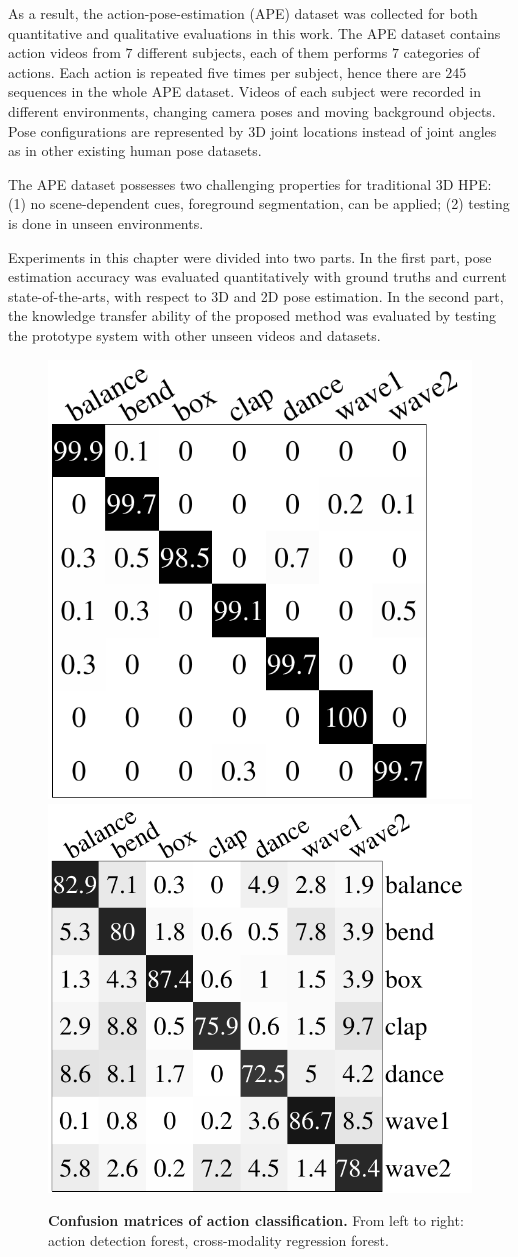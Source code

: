 As a result, the action-pose-estimation (APE) dataset was collected for both quantitative and qualitative evaluations in this work. The APE dataset contains action videos from $7$ different subjects, each of them performs $7$ categories of actions. Each action is repeated five times per subject, hence there are $245$ sequences in the whole APE dataset. 
Videos of each subject were recorded in different environments, changing camera poses and moving background objects. Pose configurations are represented by 3D joint locations instead of joint angles as in other existing human pose datasets.   

The APE dataset possesses two challenging properties for traditional 3D HPE: (1) no scene-dependent cues, \eg foreground segmentation, can be applied; (2) testing is done in unseen environments.

Experiments in this chapter were divided into two parts. In the first part, pose estimation accuracy was evaluated quantitatively with ground truths and current state-of-the-arts, with respect to 3D and 2D pose estimation. In the second part, the knowledge transfer ability of the proposed method was evaluated by testing the prototype system with other unseen videos and datasets. 

\begin{figure}[ht]
	\centering
	\includegraphics[height=0.30\linewidth]{fig/body/confm_detection.pdf} \hspace{1cm} 
	\includegraphics[height=0.30\linewidth]{fig/body/confm_regression.pdf}
	\caption{\textbf{Confusion matrices of action classification.} From left to right: action detection forest, cross-modality regression forest.} 
	\label{fig/body/confm}
\end{figure}


